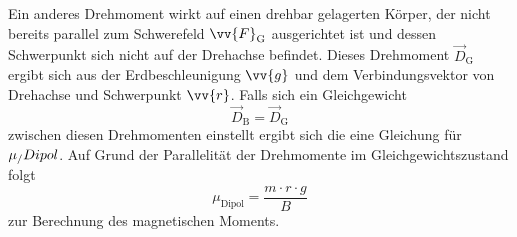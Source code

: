 Ein anderes Drehmoment wirkt auf einen drehbar gelagerten Körper, der nicht bereits parallel zum 
Schwerefeld $\vv{F}_{\text{G}}$ ausgerichtet ist und dessen Schwerpunkt sich nicht auf der Drehachse befindet. Dieses Drehmoment $\vec{D}_{\text{G}}$ ergibt sich aus der
Erdbeschleunigung $\vv{g}$ und dem Verbindungsvektor von Drehachse und Schwerpunkt $\vv{r}$.
Falls sich ein Gleichgewicht
    \begin{equation*}
    \label{eqn:Drehmoment_Gleichgewicht}
    \vec{D}_{\text{B}} = \vec{D}_{\text{G}}
\end{equation*}
zwischen diesen Drehmomenten einstellt ergibt sich die eine Gleichung für $\mu_\text/Dipol$.
Auf Grund der Parallelität der Drehmomente im Gleichgewichtszustand folgt
\begin{equation}
    \label{eqn:Drehmoment_Gleichgewicht2}
    \mu_{\text{Dipol}} = \frac{m \cdot r\cdot g}{B} 
\end{equation}
zur Berechnung des magnetischen Moments.

